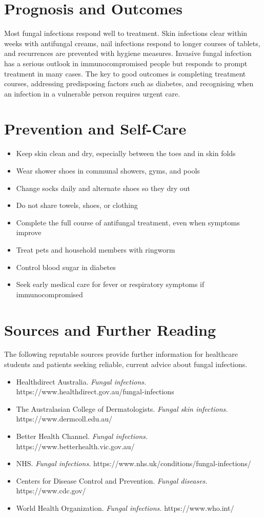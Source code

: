 \section*{Prognosis and Outcomes}
Most fungal infections respond well to treatment. Skin infections clear within weeks with antifungal creams, nail infections respond to longer courses of tablets, and recurrences are prevented with hygiene measures. Invasive fungal infection has a serious outlook in immunocompromised people but responds to prompt treatment in many cases. The key to good outcomes is completing treatment courses, addressing predisposing factors such as diabetes, and recognising when an infection in a vulnerable person requires urgent care.

\section*{Prevention and Self-Care}
\begin{itemize}
    \item Keep skin clean and dry, especially between the toes and in skin folds
    \item Wear shower shoes in communal showers, gyms, and pools
    \item Change socks daily and alternate shoes so they dry out
    \item Do not share towels, shoes, or clothing
    \item Complete the full course of antifungal treatment, even when symptoms improve
    \item Treat pets and household members with ringworm
    \item Control blood sugar in diabetes
    \item Seek early medical care for fever or respiratory symptoms if immunocompromised
\end{itemize}

\section*{Sources and Further Reading}
The following reputable sources provide further information for healthcare students and patients seeking reliable, current advice about fungal infections.
\begin{itemize}
    \item Healthdirect Australia. \textit{Fungal infections.} https://www.healthdirect.gov.au/fungal-infections
    \item The Australasian College of Dermatologists. \textit{Fungal skin infections.} https://www.dermcoll.edu.au/
    \item Better Health Channel. \textit{Fungal infections.} https://www.betterhealth.vic.gov.au/
    \item NHS. \textit{Fungal infections.} https://www.nhs.uk/conditions/fungal-infections/
    \item Centers for Disease Control and Prevention. \textit{Fungal diseases.} https://www.cdc.gov/
    \item World Health Organization. \textit{Fungal infections.} https://www.who.int/
\end{itemize}
